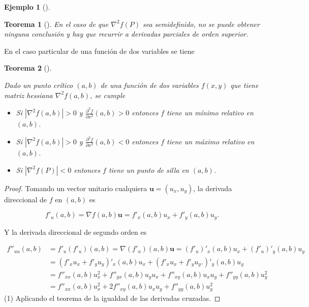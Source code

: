 \documentclass[
  a4paper,
]{scrreport}
\providecommand{\tightlist}{%
  \setlength{\itemsep}{0pt}\setlength{\parskip}{0pt}}\usepackage{longtable,booktabs,array}
\theoremstyle{definition}
\newtheorem{example}{Ejemplo}[chapter]
\theoremstyle{plain}
\theoremstyle{definition}
\theoremstyle{definition}
\theoremstyle{plain}
\newtheorem{theorem}{Teorema}[chapter]
\theoremstyle{plain}
\theoremstyle{remark}
\begin{document}
\begin{example}[]
\begin{theorem}[]
En el caso de que \(\nabla^2f(P)\) sea semidefinido, no se puede obtener
ninguna conclusión y hay que recurrir a derivadas parciales de orden
superior.

\end{theorem}

En el caso particular de una función de dos variables se tiene

\begin{theorem}[]\protect\hypertarget{thm-extremos-funcion-dos-variables}{}\label{thm-extremos-funcion-dos-variables}

Dado un punto crítico \((a, b)\) de una función de dos variables
\(f(x,y)\) que tiene matriz hessiana \(\nabla^2f(a,b)\), se cumple

\begin{itemize}
\tightlist
\item
  Si \(|\nabla^2 f(a,b)|>0\) y
  \(\frac{\partial^2 f}{\partial x^2}(a,b)>0\) entonces \(f\) tiene un
  \emph{mínimo relativo} en \((a,b)\).
\item
  Si \(|\nabla^2 f(a,b)|>0\) y
  \(\frac{\partial^2 f}{\partial x^2}(a,b)<0\) entonces \(f\) tiene un
  \emph{máximo relativo} en \((a,b)\).
\item
  Si \(|\nabla^2 f(P)|<0\) entonces \(f\) tiene un \emph{punto de silla}
  en \((a,b)\).
\end{itemize}

\end{theorem}

\begin{tcolorbox}[enhanced jigsaw, leftrule=.75mm, colbacktitle=quarto-callout-note-color!10!white, toprule=.15mm, opacityback=0, opacitybacktitle=0.6, toptitle=1mm, breakable, bottomtitle=1mm, colframe=quarto-callout-note-color-frame, rightrule=.15mm, titlerule=0mm, title=\textcolor{quarto-callout-note-color}{\faInfo}\hspace{0.5em}{Demostración}, arc=.35mm, left=2mm, bottomrule=.15mm, colback=white, coltitle=black]

\begin{proof}
Tomando un vector unitario cualquiera \(\mathbf{u}=(u_x,u_y)\), la
derivada direccional de \(f\) en \((a,b)\) es

\[
f'_u(a,b) 
= \nabla f(a,b)\mathbf{u}
= f'_x(a,b)u_x + f'_y(a,b) u_y.
\]

Y la derivada direccional de segundo orden es

\begin{align*}
f''_{uu}(a,b) 
&= f'_u(f'_u)(a,b)
= \nabla (f'_u)(a,b)\mathbf{u} 
= (f'_u)'_x(a,b)u_x + (f'_u)'_y(a,b) u_y \\
&= (f'_x u_x + f'_y u_y)'_x(a,b)u_x + (f'_x u_x + f'_y u_y.)'_y(a,b) u_y \\
&= f''_{xx}(a,b)u_x^2 + f''_{yx}(a,b)u_yu_x + f''_{xy}(a,b)u_xu_y + f''_{yy}(a,b)u_y^2 \\
&= f''_{xx}(a,b)u_x^2 + 2f''_{xy}(a,b)u_xu_y + f''_{yy}(a,b)u_y^2 \tag{1}
\end{align*} (1) Aplicando el teorema de la igualdad de las derivadas
cruzadas.


\end{proof}
\end{tcolorbox}
\end{example}
\end{document}
